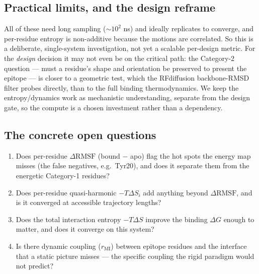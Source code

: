 \subsection{Practical limits, and the design reframe}
All of these need long sampling ($\sim\!10^2$ ns) and ideally replicates to converge, and per-residue
entropy is non-additive because the motions are correlated. So this is a deliberate, single-system
investigation, not yet a scalable per-design metric. For the \emph{design} decision it may not even be
on the critical path: the Category-2 question --- must a residue's shape and orientation be preserved
to present the epitope --- is closer to a geometric test, which the RFdiffusion backbone-RMSD filter
probes directly, than to the full binding thermodynamics. We keep the entropy/dynamics work as
mechanistic understanding, separate from the design gate, so the compute is a chosen investment rather
than a dependency.

\subsection{The concrete open questions}
\begin{enumerate}
\item Does per-residue $\Delta\mathrm{RMSF}$ (bound $-$ apo) flag the hot spots the energy map misses
(the false negatives, e.g.\ Tyr20), and does it separate them from the energetic Category-1 residues?
\item Does per-residue quasi-harmonic $-T\Delta S_i$ add anything beyond $\Delta\mathrm{RMSF}$, and is
it converged at accessible trajectory lengths?
\item Does the total interaction entropy $-T\Delta S$ improve the binding $\Delta G$ enough to matter,
and does it converge on this system?
\item Is there dynamic coupling ($r_{\mathrm{MI}}$) between epitope residues and the interface that a
static picture misses --- the specific coupling the rigid paradigm would not predict?
\end{enumerate}
